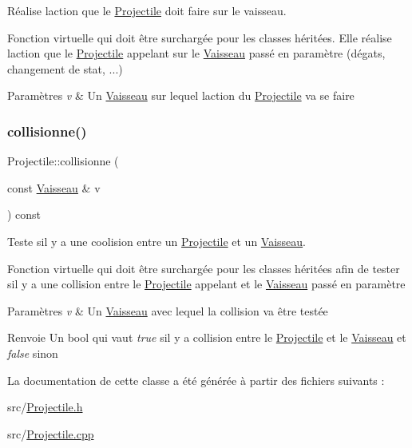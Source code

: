 Réalise l\textquotesingle{}action que le {\ttfamily \hyperlink{class_projectile}{Projectile}} doit faire sur le vaisseau. 

Fonction virtuelle qui doit être surchargée pour les classes héritées. Elle réalise l\textquotesingle{}action que le {\ttfamily \hyperlink{class_projectile}{Projectile}} appelant sur le {\ttfamily \hyperlink{class_vaisseau}{Vaisseau}} passé en paramètre (dégats, changement de stat, ...) 
\begin{DoxyParams}{Paramètres}
{\em v} & Un {\ttfamily \hyperlink{class_vaisseau}{Vaisseau}} sur lequel l\textquotesingle{}action du {\ttfamily \hyperlink{class_projectile}{Projectile}} va se faire \\
\hline
\end{DoxyParams}
\mbox{\label{class_projectile_aa5d38357da8a5fdc622b248a449523a5}} 
\subsubsection{\texorpdfstring{collisionne()}{collisionne()}}
{\footnotesize\ttfamily Projectile\+::collisionne (\begin{DoxyParamCaption}\item[{const \hyperlink{class_vaisseau}{Vaisseau} \&}]{v }\end{DoxyParamCaption}) const\hspace{0.3cm}{\ttfamily [pure virtual]}}



Teste s\textquotesingle{}il y a une coolision entre un {\ttfamily \hyperlink{class_projectile}{Projectile}} et un {\ttfamily \hyperlink{class_vaisseau}{Vaisseau}}. 

Fonction virtuelle qui doit être surchargée pour les classes héritées afin de tester s\textquotesingle{}il y a une collision entre le {\ttfamily \hyperlink{class_projectile}{Projectile}} appelant et le {\ttfamily \hyperlink{class_vaisseau}{Vaisseau}} passé en paramètre 
\begin{DoxyParams}{Paramètres}
{\em v} & Un {\ttfamily \hyperlink{class_vaisseau}{Vaisseau}} avec lequel la collision va être testée \\
\hline
\end{DoxyParams}
\begin{DoxyReturn}{Renvoie}
Un {\ttfamily bool} qui vaut {\itshape true} s\textquotesingle{}il y a collision entre le {\ttfamily \hyperlink{class_projectile}{Projectile}} et le {\ttfamily \hyperlink{class_vaisseau}{Vaisseau}} et {\itshape false} sinon 
\end{DoxyReturn}


La documentation de cette classe a été générée à partir des fichiers suivants \+:\begin{DoxyCompactItemize}
\item 
src/\hyperlink{_projectile_8h}{Projectile.\+h}\item 
src/\hyperlink{_projectile_8cpp}{Projectile.\+cpp}\end{DoxyCompactItemize}
